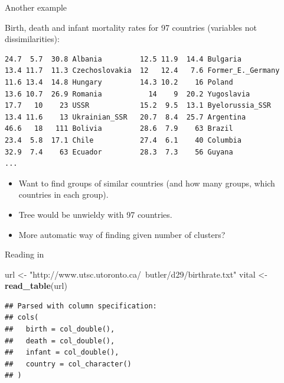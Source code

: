 \documentclass[ignorenonframetext,]{beamer}
\newenvironment{Shaded}{\begin{snugshade}}{\end{snugshade}}
\newcommand{\KeywordTok}[1]{\textcolor[rgb]{0.13,0.29,0.53}{\textbf{#1}}}
\newcommand{\NormalTok}[1]{#1}
\newcommand{\StringTok}[1]{\textcolor[rgb]{0.31,0.60,0.02}{#1}}
\begin{document}
\begin{frame}[fragile]{Another example}
\protect\hypertarget{another-example}{}

Birth, death and infant mortality rates for 97 countries (variables not
dissimilarities):

\scriptsize

\begin{verbatim}
24.7  5.7  30.8 Albania         12.5 11.9  14.4 Bulgaria
13.4 11.7  11.3 Czechoslovakia  12   12.4   7.6 Former_E._Germany
11.6 13.4  14.8 Hungary         14.3 10.2    16 Poland
13.6 10.7  26.9 Romania           14    9  20.2 Yugoslavia
17.7   10    23 USSR            15.2  9.5  13.1 Byelorussia_SSR
13.4 11.6    13 Ukrainian_SSR   20.7  8.4  25.7 Argentina
46.6   18   111 Bolivia         28.6  7.9    63 Brazil
23.4  5.8  17.1 Chile           27.4  6.1    40 Columbia
32.9  7.4    63 Ecuador         28.3  7.3    56 Guyana
...
\end{verbatim}

\normalsize

\begin{itemize}
\item
  Want to find groups of similar countries (and how many groups, which
  countries in each group).
\item
  Tree would be unwieldy with 97 countries.
\item
  More automatic way of finding given number of clusters?
\end{itemize}

\end{frame}

\begin{frame}[fragile]{Reading in}
\protect\hypertarget{reading-in-2}{}

\begin{Shaded}
\begin{Highlighting}[]
\NormalTok{url <-}\StringTok{ "http://www.utsc.utoronto.ca/~butler/d29/birthrate.txt"}
\NormalTok{vital <-}\StringTok{ }\KeywordTok{read_table}\NormalTok{(url)}
\end{Highlighting}
\end{Shaded}

\begin{verbatim}
## Parsed with column specification:
## cols(
##   birth = col_double(),
##   death = col_double(),
##   infant = col_double(),
##   country = col_character()
## )
\end{verbatim}

\end{frame}
\end{document}
